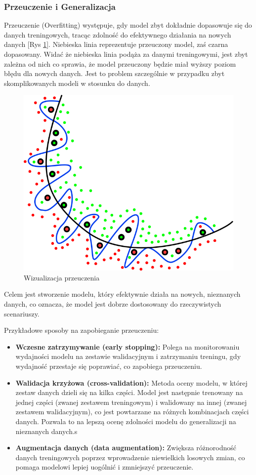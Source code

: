 \subsubsection*{Przeuczenie i Generalizacja}

Przeuczenie (Overfitting) występuje, gdy model zbyt dokładnie dopasowuje się do danych treningowych, tracąc zdolność do efektywnego działania na nowych danych [Rys \ref{fig:image17}]. Niebieska linia reprezentuje przeuczony model, zaś czarna dopasowany. Widać że niebieska linia podąża za danymi treningowymi, jest zbyt zależna od nich co sprawia, że model przeuczony będzie miał wyższy poziom błędu dla nowych danych. Jest to problem szczególnie w przypadku zbyt skomplikowanych modeli w stosunku do danych.
\begin{figure}[h]
    \centering
    \includegraphics[width=0.4\linewidth]{Rozdziały/02.Podstawy_teoretyczne/overfitting.png}
    \caption{Wizualizacja przeuczenia}
    \label{fig:image17}
\end{figure}

Celem jest stworzenie modelu, który efektywnie działa na nowych, nieznanych danych, co oznacza, że model jest dobrze dostosowany do rzeczywistych scenariuszy.

Przykładowe sposoby na zapobieganie przeuczeniu:

\begin{itemize}
    \item \textbf{Wczesne zatrzymywanie (early stopping):} Polega na monitorowaniu wydajności modelu na zestawie walidacyjnym i zatrzymaniu treningu, gdy wydajność przestaje się poprawiać, co zapobiega przeuczeniu.
    \item \textbf{Walidacja krzyżowa (cross-validation):} Metoda oceny modelu, w której zestaw danych dzieli się na kilka części. Model jest następnie trenowany na jednej części (zwanej zestawem treningowym) i walidowany na innej (zwanej zestawem walidacyjnym), co jest powtarzane na różnych kombinacjach części danych. Pozwala to na lepszą ocenę zdolności modelu do generalizacji na nieznanych danych.s
    \item \textbf{Augmentacja danych (data augmentation):} Zwiększa różnorodność danych treningowych poprzez wprowadzenie niewielkich losowych zmian, co pomaga modelowi lepiej uogólnić i zmniejszyć przeuczenie.
\end{itemize}


